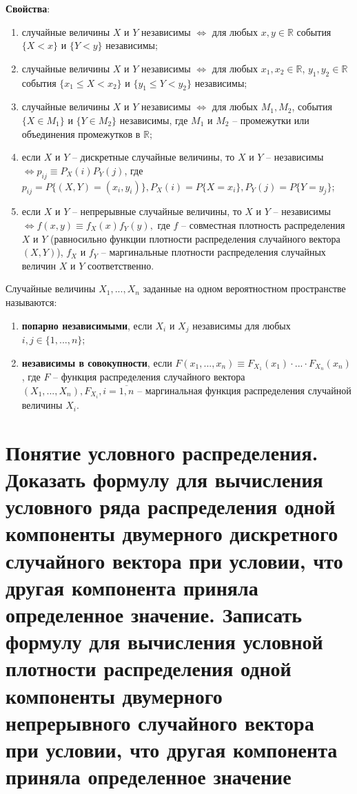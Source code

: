 \textbf{Свойства}:
\begin{enumerate}
	\item случайные величины $X$ и $Y$ независимы $\iff$ для любых $x, y \in \mathbb{R}$ события $\{X < x\}$ и $\{Y < y\}$ независимы;
	\item случайные величины $X$ и $Y$ независимы $\iff$ для любых $x_1, x_2 \in \mathbb{R}$, $y_1, y_2 \in \mathbb{R}$ события $\{x_1 \leq X < x_2\}$ и $\{y_1 \leq Y < y_2\}$ независимы;
	\item случайные величины $X$ и $Y$ независимы $\iff$ для любых $M_1, M_2$, события $\{X \in M_1\}$ и $\{Y \in M_2\}$ независимы, где $M_1$ и $M_2$ -- промежутки или объединения промежутков в $\mathbb{R}$;
	\item если $X$ и $Y$ -- дискретные случайные величины, то $X$ и $Y$ -- независимы $\iff p_{ij} \equiv P_X(i)P_Y(j)$, где $p_{ij} = P\{(X, Y) = (x_i, y_i)\}, P_X(i) = P\{X = x_i\}, P_Y(j) = P\{Y = y_j\}$;
	\item если $X$ и $Y$ -- непрерывные случайные величины, то $X$ и $Y$ -- независимы $\iff f(x, y) \equiv f_X(x)f_Y(y),$ где $f$ -- совместная плотность распределения $X$ и $Y$ (равносильно функции плотности распределения случайного вектора $(X, Y)$), $f_X$ и $f_Y$ -- маргинальные плотности распределения случайных величин $X$ и $Y$ соответственно.
\end{enumerate}

Случайные величины $X_1, ..., X_n$ заданные на одном вероятностном пространстве называются:
\begin{enumerate}
	\item \textbf{попарно независимыми}, если $X_i$ и $X_j$ независимы для любых $i, j \in \{1, ..., n\}$;
	\item \textbf{независимы в совокупности}, если $F(x_1, ..., x_n) \equiv F_{X_1}(x_1) \cdot ... \cdot F_{X_n}(x_n)$, где $F$ -- функция распределения случайного вектора $(X_1, ..., X_n), F_{X_i},  i = \overline{1, n}$ -- маргинальная функция распределения случайной величины $X_i$.
\end{enumerate}

\section{Понятие условного распределения. Доказать формулу для вычисления условного ряда распределения одной компоненты двумерного дискретного случайного вектора при условии, что другая компонента приняла определенное значение. Записать формулу для вычисления условной плотности распределения одной компоненты двумерного непрерывного случайного вектора при условии, что другая компонента приняла определенное значение}

